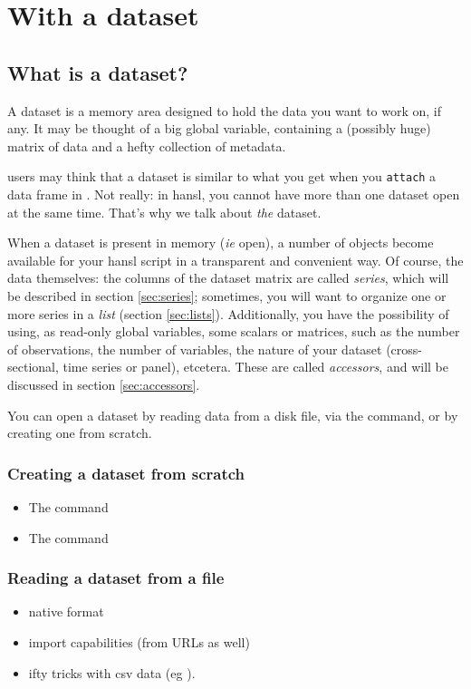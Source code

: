 \part{With a dataset}

\chapter{What is a dataset?}

A dataset is a memory area designed to hold the data you want to work
on, if any. It may be thought of a big global variable, containing a
(possibly huge) matrix of data and a hefty collection of metadata.

 users may think that a dataset is similar to what you get when
you \texttt{attach} a data frame in . Not really: in hansl, you
cannot have more than one dataset open at the same time. That's why we
talk about \emph{the} dataset.

When a dataset is present in memory (\emph{ie} open), a number of
objects become available for your hansl script in a transparent and
convenient way. Of course, the data themselves: the columns of the
dataset matrix are called \emph{series}, which will be described in
section \ref{sec:series}; sometimes, you will want to organize one or
more series in a \emph{list} (section \ref{sec:lists}). Additionally,
you have the possibility of using, as read-only global variables, some
scalars or matrices, such as the number of observations, the number of
variables, the nature of your dataset (cross-sectional, time series or
panel), etcetera. These are called \emph{accessors}, and will be
discussed in section \ref{sec:accessors}.

You can open a dataset by reading data from a disk file, via the
 command, or by creating one from scratch.

\section{Creating a dataset from scratch}
\begin{itemize}
\item The  command
\item The  command
\end{itemize}

\section{Reading a dataset from a file}
\begin{itemize}
\item native format
\item import capabilities (from URLs as well)
\item ifty tricks with csv data (eg ).
\end{itemize}


